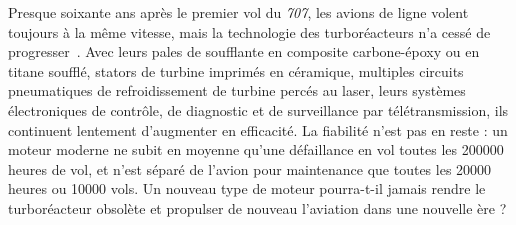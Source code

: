 Presque soixante ans après le premier vol du \textit{707}, les avions de ligne volent toujours à la même vitesse, mais la technologie des turboréacteurs n’a cessé de progresser~\cite{rollsroyce2005}. Avec leurs pales de soufflante en composite carbone-époxy ou en titane soufflé, stators de turbine imprimés en céramique, multiples circuits pneumatiques de refroidissement de turbine percés au laser, leurs systèmes électroniques de contrôle, de diagnostic et de surveillance par télétransmission, ils continuent lentement d’augmenter en efficacité. La fiabilité n’est pas en reste : un moteur moderne ne subit en moyenne qu’une défaillance en vol toutes les \num{200 000} heures de vol, et n’est séparé de l’avion pour maintenance que toutes les \num{20 000} heures ou \num{10 000} vols. Un nouveau type de moteur pourra-t-il jamais rendre le turboréacteur obsolète et propulser de nouveau l’aviation dans une nouvelle ère ?

\atendofhistorysection
